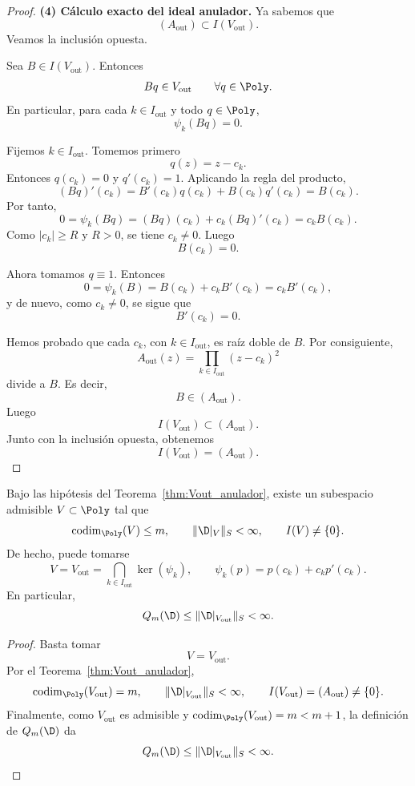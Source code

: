 \begin{proof}
	\medskip
	\textbf{(4) Cálculo exacto del ideal anulador.}
	Ya sabemos que
	\[
		(A_{\mathrm{out}})\subset I(V_{\mathrm{out}}).
	\]
	Veamos la inclusión opuesta.

	Sea $B\in I(V_{\mathrm{out}})$. Entonces
	\[
		Bq\in V_{\mathrm{out}}
		\qquad \forall q\in\Poly.
	\]
	En particular, para cada $k\in I_{\mathrm{out}}$ y todo $q\in\Poly$,
	\[
		\psi_k(Bq)=0.
	\]

	Fijemos $k\in I_{\mathrm{out}}$. Tomemos primero
	\[
		q(z)=z-c_k.
	\]
	Entonces $q(c_k)=0$ y $q'(c_k)=1$. Aplicando la regla del producto,
	\[
		(Bq)'(c_k)=B'(c_k)q(c_k)+B(c_k)q'(c_k)=B(c_k).
	\]
	Por tanto,
	\[
		0=\psi_k(Bq)=(Bq)(c_k)+c_k(Bq)'(c_k)=c_kB(c_k).
	\]
	Como $|c_k|\ge R$ y $R>0$, se tiene $c_k\neq 0$. Luego
	\[
		B(c_k)=0.
	\]

	Ahora tomamos $q\equiv 1$. Entonces
	\[
		0=\psi_k(B)=B(c_k)+c_kB'(c_k)=c_kB'(c_k),
	\]
	y de nuevo, como $c_k\neq 0$, se sigue que
	\[
		B'(c_k)=0.
	\]

	Hemos probado que cada $c_k$, con $k\in I_{\mathrm{out}}$, es raíz doble de $B$.
	Por consiguiente,
	\[
		A_{\mathrm{out}}(z)=\prod_{k\in I_{\mathrm{out}}}(z-c_k)^2
	\]
	divide a $B$. Es decir,
	\[
		B\in (A_{\mathrm{out}}).
	\]
	Luego
	\[
		I(V_{\mathrm{out}})\subset (A_{\mathrm{out}}).
	\]
	Junto con la inclusión opuesta, obtenemos
	\[
		I(V_{\mathrm{out}})=(A_{\mathrm{out}}).
	\]
\end{proof}

\begin{cor}
	\label{cor:existencia_V_estable_anulador}
	Bajo las hipótesis del Teorema~\ref{thm:Vout_anulador}, existe un subespacio admisible
	$V\subset \Poly$ tal que
	\[
		\operatorname{codim}_{\Poly}(V)\le m,
		\qquad
		\|\D|_V\|_S<\infty,
		\qquad
		I(V)\neq \{0\}.
	\]
	De hecho, puede tomarse
	\[
		V=V_{\mathrm{out}}=\bigcap_{k\in I_{\mathrm{out}}}\ker(\psi_k),
		\qquad
		\psi_k(p)=p(c_k)+c_kp'(c_k).
	\]
	En particular,
	\[
		Q_m(\D)\le \|\D|_{V_{\mathrm{out}}}\|_S<\infty.
	\]
\end{cor}

\begin{proof}
	Basta tomar
	\[
		V=V_{\mathrm{out}}.
	\]
	Por el Teorema~\ref{thm:Vout_anulador},
	\[
		\operatorname{codim}_{\Poly}(V_{\mathrm{out}})=m,
		\qquad
		\|\D|_{V_{\mathrm{out}}}\|_S<\infty,
		\qquad
		I(V_{\mathrm{out}})=(A_{\mathrm{out}})\neq\{0\}.
	\]
	Finalmente, como $V_{\mathrm{out}}$ es admisible y $\operatorname{codim}_{\Poly}(V_{\mathrm{out}})=m< m+1$,
	la definición de $Q_m(\D)$ da
	\[
		Q_m(\D)\le \|\D|_{V_{\mathrm{out}}}\|_S<\infty.
	\]
\end{proof}

